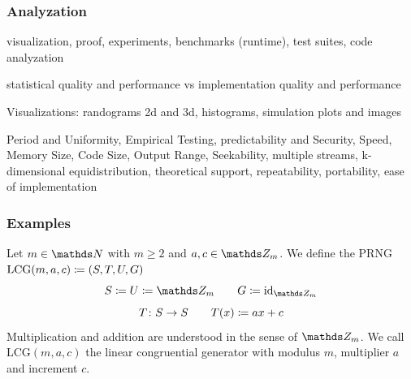 \documentclass{stdlocal}
\begin{document}
    \subsubsection{Analyzation}
    visualization, proof, experiments, benchmarks (runtime), test suites, code analyzation

    statistical quality and performance vs implementation quality and performance

    Visualizations: randograms 2d and 3d, histograms, simulation plots and images

    Period and Uniformity, Empirical Testing, predictability and Security, Speed, Memory Size, Code Size, Output Range, Seekability, multiple streams, k-dimensional equidistribution, theoretical support, repeatability, portability, ease of implementation

    \subsubsection{Examples}
      \begin{definition}
        Let $m\in\setNatural$ with $m\geq 2$ and $a,c\in\setInteger_m$.
        We define the PRNG $\mathrm{LCG}(m,a,c) \coloneqq (S,T,U,G)$
        \[
          S \define U \define \setInteger_m
          \separate
          G \define \identity_{\setInteger_m}
        \]
        \[
          T\colon S\to S
          \qquad
          T(x) \coloneqq a x + c
        \]
        Multiplication and addition are understood in the sense of $\setInteger_m$.
        We call $\mathrm{LCG}(m,a,c)$ the linear congruential generator with modulus $m$, multiplier $a$ and increment $c$.
      \end{definition}
\end{document}
